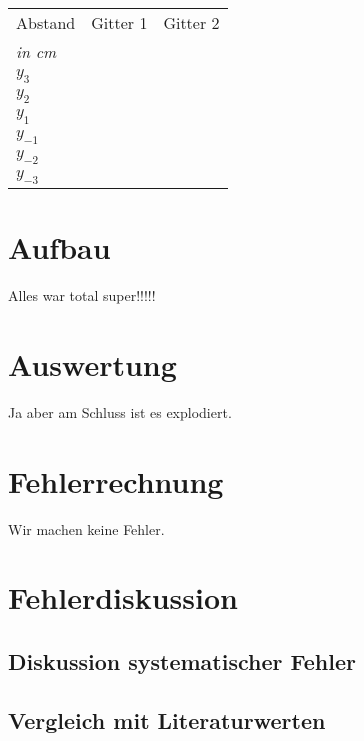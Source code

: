 \documentclass[12pt,a4paper,titlepage,headinclude,bibtotoc]{scrartcl}
\begin{document}
\begin{table}
\centering
\begin{large}

\end{large}
\begin{tabular}{|p{4 cm}||p{4 cm}|p{4 cm}|}
        \hline
          Abstand  & Gitter 1  & Gitter 2 \\
          \textit{in cm} & & \\
         
         
         \hline 
         $y_3 $& & \\
         \hline
         $y_2 $& & \\
         \hline
         $y_{1} $& & \\
         
         \hline
         $y_{-1}$& & \\
         \hline
         $y_{-2}$& & \\
         \hline             
         $y_{-3}$& & \\
         \hline
\end{tabular}
\end{table}


\section{Aufbau}
Alles war total super!!!!!


\section{Auswertung}

Ja aber am Schluss ist es explodiert.

\section{Fehlerrechnung}
Wir machen keine Fehler.


\section{Fehlerdiskussion}
\subsection{Diskussion systematischer Fehler}



\subsection{Vergleich mit Literaturwerten}
\end{document}
